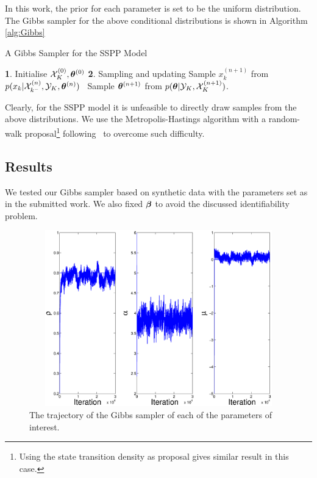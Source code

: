 \documentclass{article}
\begin{document}
In this work, the prior for each parameter is set to be the uniform distribution.
The Gibbs sampler for the above conditional distributions is shown in Algorithm \ref{alg:Gibbs}

\begin{algorithm}
	\caption{\nonumber A Gibbs Sampler for the SSPP Model}
	\label{alg:Gibbs}
	\begin{algorithmic}
		\STATE \textbf{1}. Initialise $\mathcal{X}^{(0)}_{K}, {\bm \theta}^{(0)}$
		\STATE \textbf{2}. Sampling and updating
		\STATE Sample $x^{(n+1)}_{k}$ from
		$p(x_{k}|\mathcal{X}^{(n)}_{k^-},\mathcal{Y}_{K},{\bm \theta}^{(n)})$
		\ENDFOR
		\STATE \ Sample ${\bm \theta}^{(n+1)}$ from $p({\bm \theta}|\mathcal{Y}_{K},\mathcal{X}^{(n+1)}_{K})$.
		\ENDFOR
	\end{algorithmic}
\end{algorithm}

Clearly, for the SSPP model it is unfeasible to directly draw samples from the above distributions.
We use the Metropolis-Hastings algorithm with a random-walk proposal\footnote{Using the state
transition density as proposal gives similar result in this case.} following~\cite{Geweke_2001} to overcome such difficulty.

\subsection{Results}
We tested our Gibbs sampler based on synthetic data with the parameters set as in the submitted work.
We also fixed ${\bm \beta}$ to avoid the discussed identifiability problem.

\begin{figure}[ht]
	\centering
	\includegraphics[height=3in,width = 5in]{./Figures/fixbeta.eps}
	\caption{The trajectory of the Gibbs sampler of each of the parameters of interest.}
	\label{Fig:Gibbsfixbeta}
\end{figure}
\end{document}
